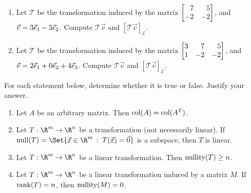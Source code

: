 \begin{exercises}
\begin{problist}
		\prob 
		\begin{enumerate}
			\item Let $\mathcal T$ be the transformation induced by the
				matrix $\mat{7&5\\-2&-2}$, and
				$\vec v=3{\vec e_1}-3{\vec e_2}$.
				Compute $\mathcal T\vec v$ and $[\mathcal T\vec v]_{\mathcal E}$.

			\item Let $\mathcal T$ be the transformation induced by the
				matrix $\mat{3&7&5\\1&-2&-2}$, and
				$\vec v=2{\vec e_1}+0{\vec e_2}+4{\vec e_3}$.
				Compute $\mathcal T\vec v$ and $[\mathcal T\vec v]_{\mathcal E}$.
		\end{enumerate}

		\prob For each statement below, determine whether it is true or false. Justify your answer.
		\begin{enumerate}
			\item Let $A$ be an arbitrary matrix. Then $\operatorname{col}(A)=\operatorname{col}(A^{T})$.

			\item Let $T:\R^{m}\to\R^{n}$ be a transformation (not necessarily
				linear). If $\Null(T)=\Set{\vec x\in\R^m \given T(\vec x)=\vec 0}$
				is a subspace, then $T$ is linear.

			\item Let $T:\R^{m}\to\R^{n}$ be a linear transformation.
				Then $\operatorname{nullity}(T) \geq n$.

			\item Let $T:\R^{m}\to\R^{n}$ be a linear transformation
				induced by a matrix $M$. If
				$\operatorname{rank}(T) = n$, then $\operatorname{nullity}(M) = 0$.
		\end{enumerate}
	\end{problist}
\end{exercises}

